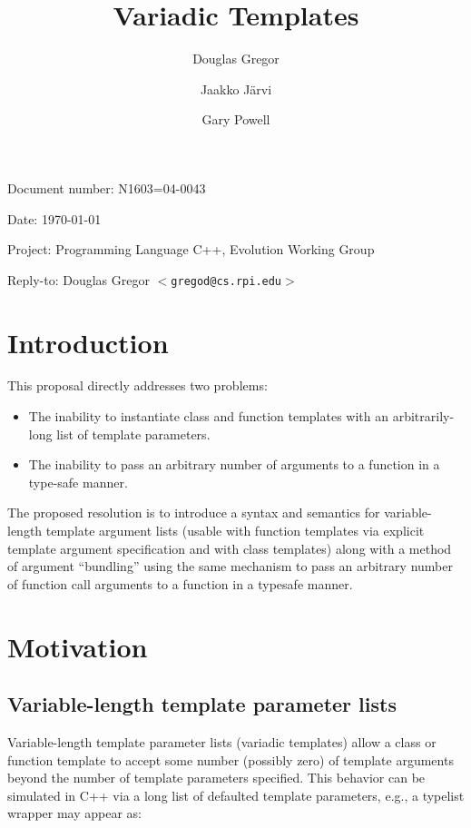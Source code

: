 \documentclass{article}
\begin{document}
\pagestyle{myheadings}

\title{Variadic Templates}
\author{Douglas Gregor \and Jaakko J\"arvi \and Gary Powell}
\date{}
\maketitle

\par\noindent Document number: N1603=04-0043
\par\noindent Date: \today
\par\noindent Project: Programming Language C++, Evolution Working Group
\par\noindent Reply-to: Douglas Gregor $<${\tt gregod@cs.rpi.edu}$>$

\section{Introduction}
This proposal directly addresses two problems:
\begin{itemize}
\item The inability to instantiate class and function templates with an arbitrarily-long list of template parameters.
\item The inability to pass an arbitrary number of arguments to a function in a type-safe manner.
\end{itemize}

The proposed resolution is to introduce a syntax and semantics for
variable-length template argument lists (usable with function templates
via explicit template argument specification and with class templates)
along with a method of argument ``bundling'' using the same mechanism to
pass an arbitrary number of function call arguments to a function in a
typesafe manner.

\section{Motivation}
\subsection{Variable-length template parameter lists}
Variable-length template parameter lists (variadic templates) allow a
class or function template to accept some number (possibly zero) of
template arguments beyond the number of template parameters specified.
This behavior can be simulated in C++ via a long list of defaulted
template parameters, e.g., a typelist wrapper may appear as:
\end{document}
